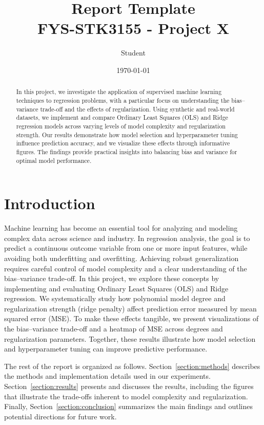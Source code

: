 \documentclass[amssymb,twocolumn,aps]{revtex4}
\begin{document}
	
\title{Report Template \\
    \normalsize FYS-STK3155 - Project X}
\date{\today}               
\author{Student}

\newpage
	
\begin{abstract}
In this project, we investigate the application of supervised machine learning techniques to regression problems, with a particular focus on understanding the bias--variance trade-off and the effects of regularization. Using synthetic and real-world datasets, we implement and compare Ordinary Least Squares (OLS) and Ridge regression models across varying levels of model complexity and regularization strength. Our results demonstrate how model selection and hyperparameter tuning influence prediction accuracy, and we visualize these effects through informative figures. The findings provide practical insights into balancing bias and variance for optimal model performance.
\end{abstract}

\maketitle

\section{Introduction}
Machine learning has become an essential tool for analyzing and modeling complex data across science and industry. In regression analysis, the goal is to predict a continuous outcome variable from one or more input features, while avoiding both underfitting and overfitting. Achieving robust generalization requires careful control of model complexity and a clear understanding of the bias--variance trade-off. In this project, we explore these concepts by implementing and evaluating Ordinary Least Squares (OLS) and Ridge regression. We systematically study how polynomial model degree and regularization strength (ridge penalty) affect prediction error measured by mean squared error (MSE). To make these effects tangible, we present visualizations of the bias--variance trade-off and a heatmap of MSE across degrees and regularization parameters. Together, these results illustrate how model selection and hyperparameter tuning can improve predictive performance.

The rest of the report is organized as follows. Section~\ref{section:methods} describes the methods and implementation details used in our experiments. Section~\ref{section:results} presents and discusses the results, including the figures that illustrate the trade-offs inherent to model complexity and regularization. Finally, Section~\ref{section:conclusion} summarizes the main findings and outlines potential directions for future work.
    
\end{document}

